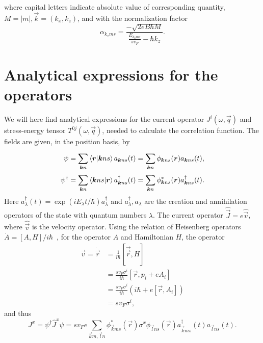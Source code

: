 where capital letters indicate absolute value of corresponding quantity, $M=|m|, \vec{k} = (k_x, k_z)$, and with the normalization factor
\begin{equation}
  \alpha _{k_z m s} = \frac{-\sqrt{2eB\hbar M}}{\frac{E_{k_z m s}}{s v_{F}} - \hbar  k_z}.
\end{equation}

\section{Analytical expressions for the operators}
We will here find analytical expressions for the current operator $J^i(\omega, \vec{q})$ and stress-energy tensor $T^{0j}(\omega, \vec{q})$, needed to calculate the correlation function.
The fields are given, in the position basis, by
\begin{align}
  \psi &= \sum\limits_{\bm{k}n}^{}\braket{\bm{r} | \bm{k} n s} a_{\bm{k}ns}(t) = \sum\limits_{\bm{k}n}^{} \phi_{\bm{k} n s} (\bm{r}) a_{\bm{k}n s}(t),\\
  \psi^{\dagger} &= \sum\limits_{\bm{k}n}^{}
                   \braket{\bm{k} ns | \bm{r} }
                   a^{\dagger}_{\bm{k}ns}(t)
                   =\sum\limits_{\bm{k}n}^{} \phi^{*}_{\bm{k} n s} (\bm{r}) a^{\dagger}_{\bm{k}n s}(t).
\end{align}
Here $a_{\lambda }^{\dagger} (t) = \exp(iE_{\lambda } t / \hbar) a_{\lambda }^{\dagger}$ and $a_{\lambda }^{\dagger}, a_{\lambda }$ are the creation and annihilation operators of the state with quantum numbers $\lambda $.
The current operator $\hat{\vec{J}} = e \hat{\vec{v}}$, where $\hat{\vec{v}}$ is the velocity operator.
Using the relation of Heisenberg operators $\dot{A} = [A, H] / i\hbar $~\cite{sakuraiModernQuantumMechanics2017}, for the operator $A$ and Hamiltonian $H$, the operator
\begin{align}
  \vec{v} = \dot{\vec{r}} &= \frac{1}{i \hbar } \left[ \vec{\vec{r}}, H \right]\\
              &= \frac{sv_F \sigma ^i}{i \hbar } \left[ \vec{r}, p_i + e A_i \right]\\
              &= \frac{s v_F \sigma^i }{i \hbar } \left( i\hbar + e[\vec{r}, A_i] \right)\\
              &=s v_F \sigma ^i,
\end{align}
and thus
\begin{equation}
  J^x = \psi ^{\dagger} \hat{J}^x \psi = sv_F e \sum\limits_{\vec{k}m, \vec{l}n}^{}
  \phi _{\vec{k}ms}^{*}(\vec{r}) \sigma ^x \phi _{\vec{l}ns}(\vec{r})
  a_{\vec{k}ms}^{\dagger}(t)
  a_{\vec{l}ns}(t).
\end{equation}
